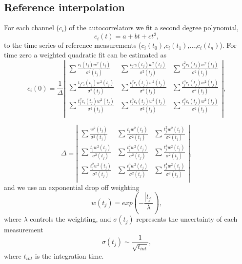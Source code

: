 \subsection{Reference interpolation}
For each channel (\(c_{i}\)) of the autocorrelators 
we fit a second degree polynomial,
\begin{equation}
c_{i}(t)=a+bt+ct^{2},
\end{equation}
to the time series of reference measurements (\(c_{i}(t_{0})\),\(c_{i}(t_{1})\),...,\(c_{i}(t_{n})\)). For time zero a weighted quadratic fit can 
be estimated as
\begin{equation}
c_{i}(0)=\frac{1}{\Delta}\left|
\begin{array}{ccc}
\sum \frac{c_{i}(t_{j})w^{2}(t_{j})}{\sigma^{2}(t_{j})} & 
\sum \frac{t_{j}c_{i}(t_{j})w^{2}(t_{j})}{\sigma^{2}(t_{j})} &
\sum \frac{t_{j}^{2}c_{i}(t_{j})w^{2}(t_{j})}{\sigma^{2}(t_{j})}\\
\sum \frac{t_{j}c_{i}(t_{j})w^{2}(t_{j})}{\sigma^{2}(t_{j})} & 
\sum \frac{t_{j}^{2}c_{i}(t_{j})w^{2}(t_{j})}{\sigma^{2}(t_{j})} &
\sum \frac{t_{j}^{3}c_{i}(t_{j})w^{2}(t_{j})}{\sigma^{2}(t_{j})}\\
\sum \frac{t_{j}^{2}c_{i}(t_{j})w^{2}(t_{j})}{\sigma^{2}(t_{j})} & 
\sum \frac{t_{j}^{3}c_{i}(t_{j})w^{2}(t_{j})}{\sigma^{2}(t_{j})} &
\sum \frac{t_{j}^{4}c_{i}(t_{j})w^{2}(t_{j})}{\sigma^{2}(t_{j})}\\
\end{array}
\right|,
\end{equation}

\begin{equation}
\Delta=\left|
\begin{array}{ccc}
\sum \frac{w^{2}(t_{j})}{\sigma^{2}(t_{j})} & 
\sum \frac{t_{j}w^{2}(t_{j})}{\sigma^{2}(t_{j})} &
\sum \frac{t_{j}^{2}w^{2}(t_{j})}{\sigma^{2}(t_{j})}\\
\sum \frac{t_{j}w^{2}(t_{j})}{\sigma^{2}(t_{j})} & 
\sum \frac{t_{j}^{2}w^{2}(t_{j})}{\sigma^{2}(t_{j})} &
\sum \frac{t_{j}^{3}w^{2}(t_{j})}{\sigma^{2}(t_{j})}\\
\sum \frac{t_{j}^{2}w^{2}(t_{j})}{\sigma^{2}(t_{j})} & 
\sum \frac{t_{j}^{3}w^{2}(t_{j})}{\sigma^{2}(t_{j})} &
\sum \frac{t_{j}^{4}w^{2}(t_{j})}{\sigma^{2}(t_{j})}\\
\end{array}
\right|,
\end{equation}
and we use an exponential drop off weighting
\begin{equation}
w(t_{j})=exp\left(-\frac{|t_{j}|}{\lambda} \right),
\end{equation}
where \(\lambda\) controls the weighting,
and \(\sigma(t_{j})\) represents the uncertainty of each measurement
\begin{equation}
\sigma(t_{j})\sim\frac{1}{\sqrt{t_{int}}},
\end{equation}
where \(t_{int}\) is the integration time.

